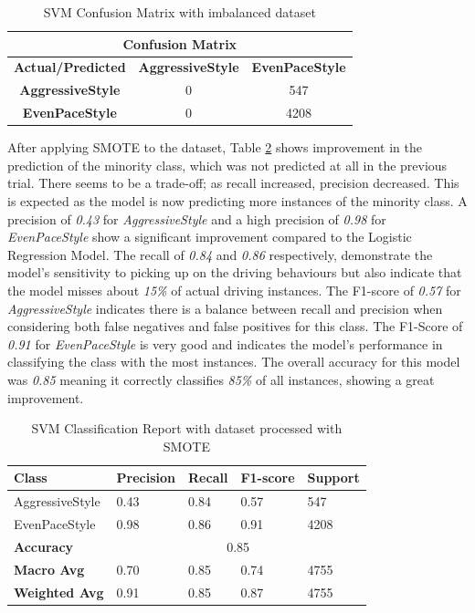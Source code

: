 \documentclass[10pt,journal,compsoc]{IEEEtran}
\begin{document}
\begin{table}[h]
    \centering
    \begin{tabular}{|c|c|c|}
    \hline
    \multicolumn{3}{|c|}{\textbf{Confusion Matrix}} \\
    \hline
    \textbf{Actual/Predicted} & \textbf{AggressiveStyle} & \textbf{EvenPaceStyle} \\ \hline
    \textbf{AggressiveStyle} & 0 & 547 \\ \hline
    \textbf{EvenPaceStyle} & 0 & 4208 \\ \hline
    \end{tabular}
    \caption{SVM Confusion Matrix with imbalanced dataset}
    \label{table:confusion_matrix}
\end{table}

After applying SMOTE to the dataset, Table \ref{table:classification_report_smote} shows improvement in the prediction of the minority class, which was not predicted at all 
in the previous trial. There seems to be a trade-off; as recall increased, precision decreased. This is expected as the model is now predicting more instances of the minority class.
A precision of \textit{0.43} for \textit{AggressiveStyle} and a high precision of \textit{0.98} for \textit{EvenPaceStyle} show a significant improvement compared to the Logistic Regression Model.
The recall of \textit{0.84} and \textit{0.86} respectively, demonstrate the model's sensitivity to picking up on the driving behaviours but also indicate that the model misses about \textit{15\%} of actual driving instances. 
The F1-score of \textit{0.57} for \textit{AggressiveStyle} indicates there is a balance between recall and precision when considering both false negatives and false
positives for this class. The F1-Score of \textit{0.91} for \textit{EvenPaceStyle} is very good and indicates the model's performance in classifying the class with the most instances.
The overall accuracy for this model was \textit{0.85} meaning it correctly classifies \textit{85\%} of all instances, showing a great improvement.

\begin{table}[h]
    \centering    
    \begin{tabular}{|l|l|l|l|l|}
    \hline
    \textbf{Class} & \textbf{Precision} & \textbf{Recall} & \textbf{F1-score} & \textbf{Support} \\ \hline
    AggressiveStyle & 0.43 & 0.84 & 0.57 & 547 \\ \hline
    EvenPaceStyle & 0.98 & 0.86 & 0.91 & 4208 \\ \hline
    \textbf{Accuracy} & \multicolumn{4}{c|}{0.85} \\ \hline
    \textbf{Macro Avg} & 0.70 & 0.85 & 0.74 & 4755 \\ \hline
    \textbf{Weighted Avg} & 0.91 & 0.85 & 0.87 & 4755 \\ \hline
    \end{tabular}
    \caption{SVM Classification Report with dataset processed with SMOTE}
    \label{table:classification_report_smote}
\end{table}
\end{document}
